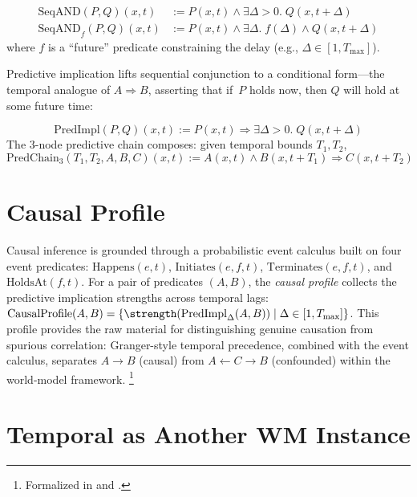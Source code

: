 \documentclass[11pt,openany]{report}
\begin{document}
\begin{definition}
\begin{align}
  \mathrm{SeqAND}(P, Q)(x, t) &:= P(x, t) \wedge \exists \Delta > 0.\; Q(x, t + \Delta) \\
  \mathrm{SeqAND}_f(P, Q)(x, t) &:= P(x, t) \wedge \exists \Delta.\;
    f(\Delta) \wedge Q(x, t + \Delta)
\end{align}
where $f$ is a ``future'' predicate constraining the delay (e.g.,
$\Delta \in [1, T_{\max}]$).
\end{definition}

Predictive implication lifts sequential conjunction to a conditional
form---the temporal analogue of $A \Rightarrow B$, asserting that if~$P$
holds now, then $Q$ will hold at some future time:

\begin{definition}
\[
  \mathrm{PredImpl}(P, Q)(x, t) := P(x, t) \Rightarrow \exists \Delta > 0.\; Q(x, t + \Delta)
\]
The 3-node predictive chain composes: given temporal bounds $T_1, T_2$,
\[
  \mathrm{PredChain}_3(T_1, T_2, A, B, C)(x, t) :=
  A(x, t) \wedge B(x, t + T_1) \Rightarrow C(x, t + T_2)
\]
\end{definition}

\section{Causal Profile}

Causal inference is grounded through a probabilistic event calculus
built on four event predicates: $\mathrm{Happens}(e, t)$,
$\mathrm{Initiates}(e, f, t)$, $\mathrm{Terminates}(e, f, t)$, and
$\mathrm{HoldsAt}(f, t)$.  For a pair of predicates $(A, B)$, the
\emph{causal profile} collects the predictive implication strengths across
temporal lags:
$\mathrm{CausalProfile}(A, B) = \{\strength(\mathrm{PredImpl}_\Delta(A, B))
\mid \Delta \in [1, T_{\max}]\}$.  This profile provides the raw material
for distinguishing genuine causation from spurious correlation:
Granger-style temporal precedence, combined with the event calculus,
separates $A \to B$ (causal) from $A \leftarrow C \to B$ (confounded)
within the world-model framework.%
\footnote{Formalized in  and
  .}

\section{Temporal as Another WM Instance}
\end{document}
